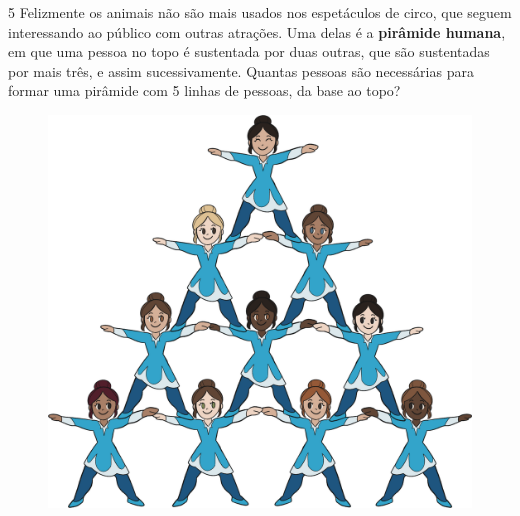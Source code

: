 \begin{emptybox}
\end{emptybox}

\num{5} Felizmente os animais não são mais usados nos espetáculos de circo,
que seguem interessando ao público com outras atrações. Uma delas é a 
\textbf{pirâmide humana}, em que uma pessoa no topo é sustentada por duas
outras, que são sustentadas por mais três, e assim sucessivamente. Quantas
pessoas são necessárias para formar uma pirâmide com 5 linhas de pessoas,
da base ao topo?

\begin{figure}[htpb!]
\centering
\includegraphics[width=\textwidth]{./ilustras-mat/modulo_6-atividade_5.png}
\end{figure}


\begin{emptybox}
\end{emptybox}


